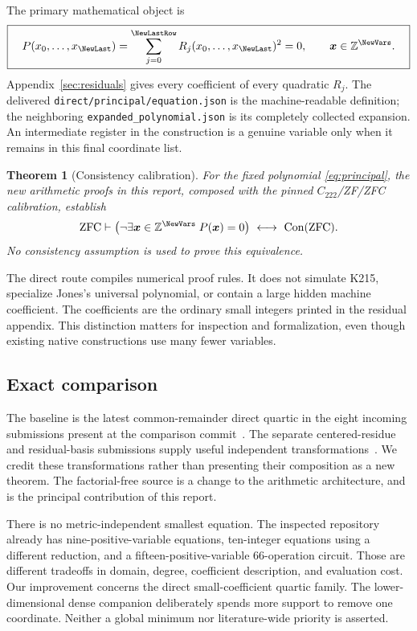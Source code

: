 \documentclass[11pt]{article}
\newtheorem{theorem}{Theorem}[section]
\theoremstyle{definition}
\newcommand{\Z}{\mathbb Z}
\newcommand{\Con}{\operatorname{Con}}
\begin{document}
The primary mathematical object is
\begin{equation}\label{eq:principal}
 \boxed{\quad P(x_0,\ldots,x_{\NewLast})
       =\sum_{j=0}^{\NewLastRow} R_j(x_0,\ldots,x_{\NewLast})^2=0,
       \qquad \boldsymbol x\in\Z^{\NewVars}.\quad}
\end{equation}
Appendix~\ref{sec:residuals} gives every coefficient of every quadratic
$R_j$. The delivered \nolinkurl{direct/principal/equation.json}
is the machine-readable definition; the neighboring
\nolinkurl{expanded_polynomial.json} is its completely collected expansion.
An intermediate register in the construction is a genuine variable only
when it remains in this final coordinate list.

\begin{theorem}[Consistency calibration]\label{thm:main}
For the fixed polynomial \eqref{eq:principal}, the new arithmetic proofs in
this report, composed with the pinned $C_{222}$/ZF/ZFC calibration, establish
\[
 \mathrm{ZFC}\vdash
 \left(\neg\exists\boldsymbol x\in\Z^{\NewVars}\;
 P(\boldsymbol x)=0\right)\ \longleftrightarrow\ \Con(\mathrm{ZFC}).
\]
No consistency assumption is used to prove this equivalence.
\end{theorem}

The direct route compiles numerical proof rules. It does not simulate
K215, specialize Jones's universal polynomial, or contain a large hidden
machine coefficient. The coefficients are the ordinary small integers
printed in the residual appendix. This distinction matters for inspection
and formalization, even though existing native constructions use many fewer
variables.

\subsection{Exact comparison}



The baseline is the latest common-remainder direct quartic in the eight
incoming submissions present at the comparison commit~\cite{common,repo}.
The separate centered-residue and residual-basis submissions supply useful
independent transformations~\cite{centered,bases}. We credit these
transformations rather than presenting their composition as a new theorem.
The factorial-free source is a change to the arithmetic architecture, and
is the principal contribution of this report.

There is no metric-independent smallest equation. The inspected repository
already has nine-positive-variable equations, ten-integer equations using a
different reduction, and a fifteen-positive-variable 66-operation circuit.
Those are different tradeoffs in domain, degree, coefficient description,
and evaluation cost. Our improvement concerns the direct small-coefficient
quartic family. The lower-dimensional dense companion deliberately spends
more support to remove one coordinate. Neither a global minimum nor
literature-wide priority is asserted.
\end{document}
